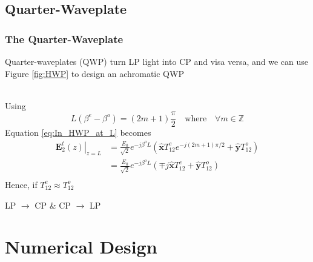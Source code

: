 \documentclass[aspectratio=169,t,xcolor=table]{beamer}
\newcommand{\bv}[1]{\mathbf{#1}}
\newcommand{\vecc}[1]{\mathbf{#1}}
\begin{document}
    \subsection{Quarter-Waveplate}
    \begin{frame}
        \frametitle{The Quarter-Waveplate} \vspace{-1em}
        \begin{block}{}
            Quarter-waveplates (QWP) turn LP light into CP and visa versa, and
            we can use Figure \ref{fig:HWP} to design an achromatic QWP
        \end{block}\\\vspace{1em}\pause
         Using 
        \begin{equation}\label{eq:L_QWP}
            L(\beta^e-\beta^o) = (2m+1)\frac{\pi}{2}
            \quad\text{where}\quad
            \forall m \in \mathbb{Z}
        \end{equation}\pause
        Equation \eqref{eq:In_HWP_at_L} becomes 
        \begin{equation}\label{eq:Func_QWP}
            \begin{aligned}
            \left.\vecc{E}^t_2(z) \right|_{z = L} &
            = \frac{E_0}{\sqrt{2}}e^{-j\beta^oL}\left(
                \bv{\hat{x}}T_{12}^{e} e^{-j(2m+1)\pi/2} +
                \bv{\hat{y}}T_{12}^{o} 
            \right)\\
            & = \frac{E_0}{\sqrt{2}}e^{-j\beta^o L}\left(
                \mp j\bv{\hat{x}}T_{12}^{e} + \bv{\hat{y}}T_{12}^{o} 
            \right)\\
            \end{aligned}
        \end{equation} \pause
        Hence, if $T_{12}^e\approx T_{12}^o$\\
        \begin{center} 
            LP $\rightarrow$ CP \hspace{5em} \& \hspace{5em} CP $\rightarrow$ LP
        \end{center}
    
        \end{frame}


        \section{Numerical Design}
\end{document}

